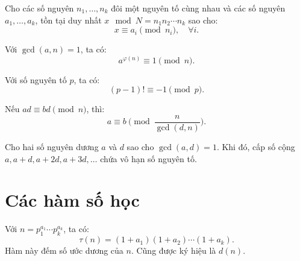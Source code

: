 \documentclass[../imo-training-open-book.tex]{subfiles}
\begin{document}
\vspace{1em}

\begin{theorem}
    \label{theorem:chinese-remainder-theorem}
    Cho các số nguyên \( n_1, \dots, n_k \) đôi một nguyên tố cùng nhau và các số nguyên \( a_1, \dots, a_k \), tồn tại duy nhất \( x \mod N = n_1n_2\cdots n_k \) sao cho:
    \[
        x \equiv a_i \pmod{n_i},\quad \forall i.
    \]
\end{theorem}

\vspace{1em}

\begin{theorem}
    \label{theorem:euler}
    Với \( \gcd(a, n) = 1 \), ta có:
    \[
        a^{\varphi(n)} \equiv 1 \pmod{n}.
    \]
\end{theorem}

\vspace{1em}

\begin{theorem}
    \label{theorem:wilson}
    Với số nguyên tố \( p \), ta có:
    \[
        (p - 1)! \equiv -1 \pmod{p}.
    \]
\end{theorem}

\vspace{1em}

\begin{theorem}
    \label{theorem:cancel-modulo}
    Nếu \( ad \equiv bd \pmod{n} \), thì:
    \[
        a \equiv b \pmod{\frac{n}{\gcd(d,n)}}.
    \]
\end{theorem}

\begin{theorem}
    \label{theorem:dirichlet-ap}
    Cho hai số nguyên dương \( a \) và \( d \) sao cho \(\gcd(a,d) = 1\). Khi đó, cấp số cộng \( a, a+d, a+2d, a+3d, \ldots \) chứa vô hạn số nguyên tố.
\end{theorem}

\newpage

\section{Các hàm số học}

\begin{definition}
    \label{definition:tau-function}
    Với \( n = p_1^{a_1} \cdots p_k^{a_k} \), ta có:
    \[
        \tau(n) = (1 + a_1)(1 + a_2) \cdots (1 + a_k).
    \]
    Hàm này đếm số ước dương của \( n \). Cũng được ký hiệu là \( d(n) \).
\end{definition}
\end{document}
